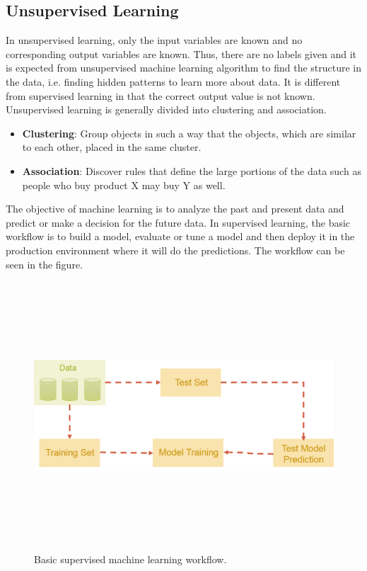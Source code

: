 \subsection{Unsupervised Learning}

In unsupervised learning, only the input variables are known and no corresponding output variables are known. Thus, there are no labels given and it is expected from unsupervised machine learning algorithm to find the structure in the data, i.e. finding hidden patterns to learn more about data. It is different from supervised learning in that the correct output value is not known. Unsupervised learning is generally divided into clustering and association.

\begin{itemize}
	\item \textbf{Clustering}: Group objects in such a way that the objects, which are similar to each other, placed in the same cluster.
	\item \textbf{Association}: Discover rules that define the large portions of the data such as people who buy product X may buy Y as well.
\end{itemize}

The objective of machine learning is to analyze the past and present data and predict or make a decision for the future data. In supervised learning, the basic workflow is to build a model, evaluate or tune a model and then deploy it in the production environment where it will do the predictions. The workflow can be seen in the figure.


\begin{figure}[htpb]
	\centering
	\includegraphics[width=12cm,height=10cm,keepaspectratio=true]{images/basic-ml-model.png}
	\caption{
		Basic supervised machine learning workflow.
	}
	\label{fig:basic-ml-model}
\end{figure}


